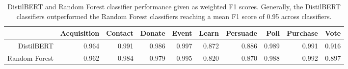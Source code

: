 \begin{table}[ht]
\centering
\begin{tabular}{rrrrrrrrrr}
  \hline
 & Acquisition & Contact & Donate & Event & Learn & Persuade & Poll & Purchase & Vote \\ 
  \hline
DistilBERT & 0.964 & 0.991 & 0.986 & 0.997 & 0.872 & 0.886 & 0.989 & 0.991 & 0.916 \\ 
  Random Forest & 0.962 & 0.984 & 0.979 & 0.995 & 0.820 & 0.870 & 0.988 & 0.992 & 0.897 \\ 
   \hline
\end{tabular}
\caption{DistilBERT and Random Forest classifier performance given as weighted F1 scores. Generally, the DistilBERT classifiers outperformed the Random Forest classifiers reaching a mean F1 score of 0.95 across classifiers.} 
\label{model_performance}
\end{table}
